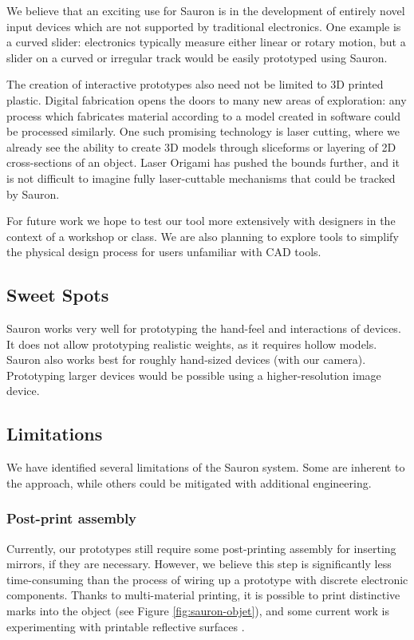 We believe that an exciting use for Sauron is in the development of entirely novel input devices which are not supported by traditional electronics. One example is a curved slider: electronics typically measure either linear or rotary motion, but a slider on a curved or irregular track would be easily prototyped using Sauron.

The creation of interactive prototypes also need not be limited to 3D printed plastic. Digital fabrication opens the doors to many new areas of exploration: any process which fabricates material according to a model created in software could be processed similarly. One such promising technology is laser cutting, where we already see the ability to create 3D models through sliceforms or layering of 2D cross-sections of an object. Laser Origami \cite{mueller-laserorigami} has pushed the bounds further, and it is not difficult to imagine fully laser-cuttable mechanisms that could be tracked by Sauron.

For future work we hope to test our tool more extensively with designers in the context of a workshop or class. We are also planning to explore tools to simplify the physical design process for users unfamiliar with CAD tools. 

    \subsection{Sweet Spots}
    
    Sauron works very well for prototyping the hand-feel and interactions of devices. It does not allow prototyping realistic weights, as it requires hollow models. Sauron also works best for roughly hand-sized devices (with our camera). Prototyping larger devices would be possible using a higher-resolution image device.
    
    \subsection{Limitations}
    
    We have identified several limitations of the Sauron system. Some are inherent to the approach, while others could be mitigated with additional engineering.
    
    \subsubsection{Post-print assembly}
    
    Currently, our prototypes still require some post-printing assembly for inserting mirrors, if they are necessary. However, we believe this step is significantly less time-consuming than the process of wiring up a prototype with discrete electronic components. Thanks to multi-material printing, it is possible to print distinctive marks into the object (see Figure \ref{fig:sauron-objet}), and some current work is experimenting with printable reflective surfaces \cite{parthy-reflective}.

